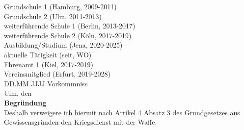 \documentclass[12pt]{article}
\newcommand{\Ort}{Ulm}
\begin{document}
Grundschule 1 (Hamburg, 2009-2011)\\
Grundschule 2 (Ulm, 2011-2013)\\
weiterführende Schule 1 (Berlin, 2013-2017)\\
weiterführende Schule 2 (Köln, 2017-2019)\\
Ausbildung/Studium (Jena, 2020-2025)\\
aktuelle Tätigkeit (seit, WO)\\
Ehrenamt 1 (Kiel, 2017-2019)\\
Vereinsmitglied (Erfurt, 2019-2028)\\
DD.MM.JJJJ Vorkommniss\\
\vfill 
\noindent
\Ort, den \ddmmyyyydate{\today}\\
\newpage 
\noindent
{\Large \textbf{Begründung}}\\[0.5cm]
Deshalb verweigere ich hiermit nach Artikel 4 Absatz 3 des Grundgesetzes aus Gewissensgründen den Kriegsdienst mit der Waffe.

 
\end{document}
